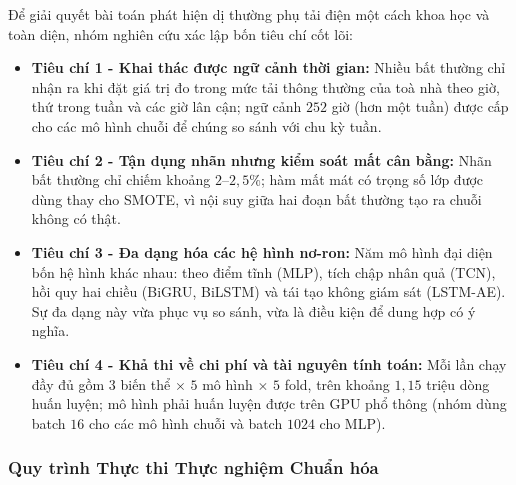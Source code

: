 Để giải quyết bài toán phát hiện dị thường phụ tải điện một cách khoa học và toàn diện, nhóm nghiên cứu xác lập bốn tiêu chí cốt lõi:
\begin{itemize}
    \item \textbf{Tiêu chí 1 - Khai thác được ngữ cảnh thời gian:} Nhiều bất thường chỉ nhận ra khi đặt giá trị đo trong mức tải thông thường của toà nhà theo giờ, thứ trong tuần và các giờ lân cận; ngữ cảnh $252$ giờ (hơn một tuần) được cấp cho các mô hình chuỗi để chúng so sánh với chu kỳ tuần.
    \item \textbf{Tiêu chí 2 - Tận dụng nhãn nhưng kiểm soát mất cân bằng:} Nhãn bất thường chỉ chiếm khoảng $2$--$2{,}5\%$; hàm mất mát có trọng số lớp được dùng thay cho SMOTE, vì nội suy giữa hai đoạn bất thường tạo ra chuỗi không có thật.
    \item \textbf{Tiêu chí 3 - Đa dạng hóa các hệ hình nơ-ron:} Năm mô hình đại diện bốn hệ hình khác nhau: theo điểm tĩnh (MLP), tích chập nhân quả (TCN), hồi quy hai chiều (BiGRU, BiLSTM) và tái tạo không giám sát (LSTM-AE). Sự đa dạng này vừa phục vụ so sánh, vừa là điều kiện để dung hợp có ý nghĩa.
    \item \textbf{Tiêu chí 4 - Khả thi về chi phí và tài nguyên tính toán:} Mỗi lần chạy đầy đủ gồm $3$ biến thể $\times$ $5$ mô hình $\times$ $5$ fold, trên khoảng $1{,}15$ triệu dòng huấn luyện; mô hình phải huấn luyện được trên GPU phổ thông (nhóm dùng batch $16$ cho các mô hình chuỗi và batch $1024$ cho MLP).
\end{itemize}

\subsubsection{Quy trình Thực thi Thực nghiệm Chuẩn hóa}

